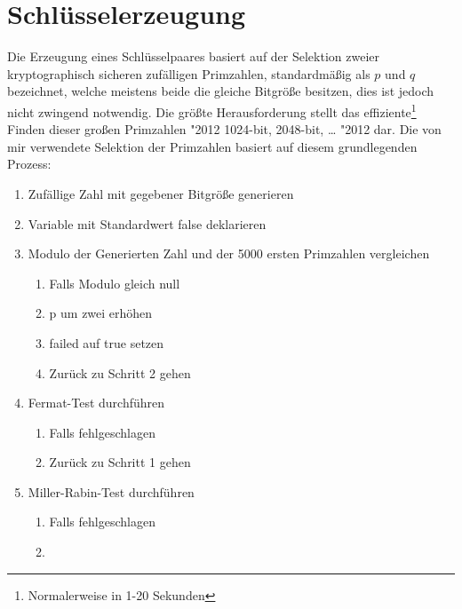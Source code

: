 \section{Schlüsselerzeugung}

Die Erzeugung eines Schlüsselpaares basiert auf der Selektion zweier kryptographisch sicheren zufälligen Primzahlen, standardmäßig als $p$ und $q$ bezeichnet, welche meistens beide die gleiche Bitgröße besitzen, dies ist jedoch nicht zwingend notwendig. Die größte Herausforderung stellt das effiziente\footnote{Normalerweise in 1-20 Sekunden} Finden dieser großen Primzahlen \char"2012{} 1024-bit, 2048-bit, \ldots{} \char"2012{} dar. Die von mir verwendete Selektion der Primzahlen basiert auf diesem grundlegenden Prozess:

\begin{enumerate}
  \item Zufällige Zahl mit gegebener Bitgröße generieren
  \item Variable  mit Standardwert false deklarieren
  \item Modulo der Generierten Zahl und der 5000 ersten Primzahlen vergleichen
    \begin{enumerate}
      \item Falls Modulo gleich null
      \item p um zwei erhöhen
      \item failed auf true setzen
      \item Zurück zu Schritt 2 gehen
    \end{enumerate}
  \item Fermat-Test durchführen
    \begin{enumerate}
      \item Falls fehlgeschlagen
      \item Zurück zu Schritt 1 gehen
    \end{enumerate}
  \item Miller-Rabin-Test durchführen
    \begin{enumerate}
      \item Falls fehlgeschlagen
      \item
    \end{enumerate}
\end{enumerate}

